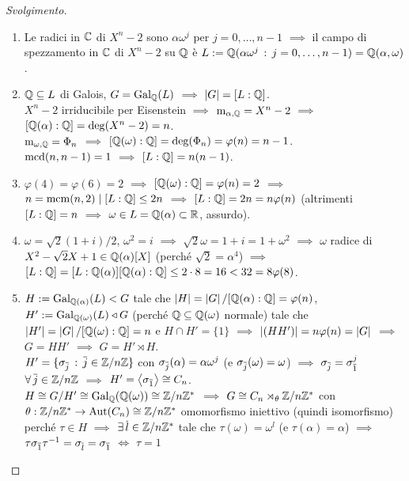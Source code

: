 \begin{proof}[Svolgimento]
\begin{enumerate}
\item Le radici in \(\C\) di \(X^n-2\) sono \(\alpha\omega^j\) per \(j=0,\dots,n-1\) \(\implies\) il campo di spezzamento in \(\C\) di \(X^n-2\) su \(\Q\) è \(L:=\Q(\alpha\omega^j\st j=0,\dots,n-1)=\Q(\alpha,\omega)\).
\item \(\Q\subseteq L\) di Galois, \(G=\Gal[\Q]{L}\) \(\implies\) \(\card{G}=[L:\Q]\). \\
\(X^n-2\) irriducibile per Eisenstein \(\implies\) \(\polmin_{\alpha,\Q}=X^n-2\) \(\implies\) \([\Q(\alpha):\Q]=\deg(X^n-2)=n\). \\
\(\polmin_{\omega,\Q}=\Phi_n\) \(\implies\) \([\Q(\omega):\Q]=\deg(\Phi_n)=\varphi(n)=n-1\). \\
\(\mcd(n,n-1)=1\) \(\implies\) \([L:\Q]=n(n-1)\).
\item \(\varphi(4)=\varphi(6)=2\) \(\implies\) \([\Q(\omega):\Q]=\varphi(n)=2\) \(\implies\) \(n=\mcm(n,2)\dvd[L:\Q]\le2n\) \(\implies\) \([L:\Q]=2n=n\varphi(n)\) (altrimenti \([L:\Q]=n\) \(\implies\) \(\omega\in L=\Q(\alpha)\subset\R\), assurdo).
\item \(\omega=\sqrt{2}(1+i)/2\), \(\omega^2=i\) \(\implies\) \(\sqrt{2}\omega=1+i=1+\omega^2\) \(\implies\) \(\omega\) radice di \(X^2-\sqrt{2}X+1\in\Q(\alpha)[X]\) (perché \(\sqrt{2}=\alpha^4\)) \(\implies\) \([L:\Q]=[L:\Q(\alpha)][\Q(\alpha):\Q]\le2\cdot8=16<32=8\varphi(8)\).
\item \(H:=\Gal[\Q(\alpha)]{L}<G\) tale che \(\card{H}=\card{G}/[\Q(\alpha):\Q]=\varphi(n)\), \(H':=\Gal[\Q(\omega)]{L}\normal G\) (perché \(\Q\subseteq\Q(\omega)\) normale) tale che \(\card{H'}=\card{G}/[\Q(\omega):\Q]=n\) e \(H\cap H'=\{1\}\) \(\implies\) \(\card{(HH')}=n\varphi(n)=\card{G}\) \(\implies\) \(G=HH'\) \(\implies\) \(G=H'\rtimes H\). \\
\(H'=\{\sigma_{\cl{j}}\st\cl{j}\in\Z/n\Z\}\) con \(\sigma_{\cl{j}}(\alpha)=\alpha\omega^j\) (e \(\sigma_{\cl{j}}(\omega)=\omega\)) \(\implies\) \(\sigma_{\cl{j}}=\sigma_{\cl{1}}^j\) \(\all \cl{j}\in\Z/n\Z\) \(\implies\) \(H'=\gen{\sigma_{\cl{1}}}\iso C_n\). \\
\(H\iso G/H'\iso\Gal[\Q]{\Q(\omega)}\iso\Z/n\Z^*\) \(\implies\) \(G\iso C_n\rtimes_{\theta}\Z/n\Z^*\) con \(\theta : \Z/n\Z^*\to\Aut(C_n)\iso\Z/n\Z^*\) omomorfismo iniettivo (quindi isomorfismo) perché \(\tau\in H\) \(\implies\) \(\exi\cl{l}\in\Z/n\Z^*\) tale che \(\tau(\omega)=\omega^l\) (e \(\tau(\alpha)=\alpha\)) \(\implies\) \(\tau\sigma_{\cl{1}}\tau^{-1}=\sigma_{\cl{l}}=\sigma_{\cl{1}}\) \(\iff\) \(\tau=1\) \qedhere
\end{enumerate}
\end{proof}


